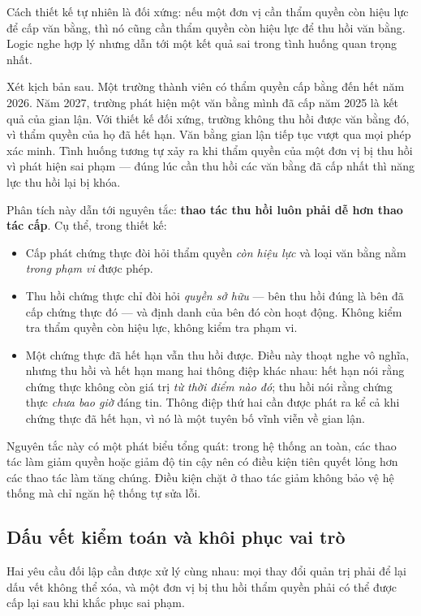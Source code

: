 Cách thiết kế tự nhiên là đối xứng: nếu một đơn vị cần thẩm quyền còn hiệu lực để cấp văn bằng, thì nó cũng cần thẩm quyền còn hiệu lực để thu hồi văn bằng. Logic nghe hợp lý nhưng dẫn tới một kết quả sai trong tình huống quan trọng nhất.

Xét kịch bản sau. Một trường thành viên có thẩm quyền cấp bằng đến hết năm 2026. Năm 2027, trường phát hiện một văn bằng mình đã cấp năm 2025 là kết quả của gian lận. Với thiết kế đối xứng, trường không thu hồi được văn bằng đó, vì thẩm quyền của họ đã hết hạn. Văn bằng gian lận tiếp tục vượt qua mọi phép xác minh. Tình huống tương tự xảy ra khi thẩm quyền của một đơn vị bị thu hồi vì phát hiện sai phạm --- đúng lúc cần thu hồi các văn bằng đã cấp nhất thì năng lực thu hồi lại bị khóa.

Phân tích này dẫn tới nguyên tắc: \textbf{thao tác thu hồi luôn phải dễ hơn thao tác cấp}. Cụ thể, trong thiết kế:

\begin{itemize}
    \item Cấp phát chứng thực đòi hỏi thẩm quyền \emph{còn hiệu lực} và loại văn bằng nằm \emph{trong phạm vi} được phép.
    \item Thu hồi chứng thực chỉ đòi hỏi \emph{quyền sở hữu} --- bên thu hồi đúng là bên đã cấp chứng thực đó --- và định danh của bên đó còn hoạt động. Không kiểm tra thẩm quyền còn hiệu lực, không kiểm tra phạm vi.
    \item Một chứng thực đã hết hạn vẫn thu hồi được. Điều này thoạt nghe vô nghĩa, nhưng thu hồi và hết hạn mang hai thông điệp khác nhau: hết hạn nói rằng chứng thực không còn giá trị \emph{từ thời điểm nào đó}; thu hồi nói rằng chứng thực \emph{chưa bao giờ} đáng tin. Thông điệp thứ hai cần được phát ra kể cả khi chứng thực đã hết hạn, vì nó là một tuyên bố vĩnh viễn về gian lận.
\end{itemize}

Nguyên tắc này có một phát biểu tổng quát: trong hệ thống an toàn, các thao tác làm giảm quyền hoặc giảm độ tin cậy nên có điều kiện tiên quyết lỏng hơn các thao tác làm tăng chúng. Điều kiện chặt ở thao tác giảm không bảo vệ hệ thống mà chỉ ngăn hệ thống tự sửa lỗi.

\subsection{Dấu vết kiểm toán và khôi phục vai trò}

Hai yêu cầu đối lập cần được xử lý cùng nhau: mọi thay đổi quản trị phải để lại dấu vết không thể xóa, và một đơn vị bị thu hồi thẩm quyền phải có thể được cấp lại sau khi khắc phục sai phạm.

